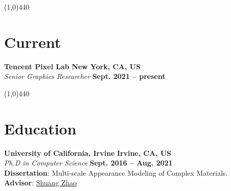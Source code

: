 \documentclass[margin,line]{resume}
\begin{document}
\begin{resume}


    
    \vspace{-5.0mm}
    \line(1,0){440}
    \vspace{-5.0mm}

    \section{\mysidestyle Current}

    \textbf{Tencent Pixel Lab}       \hfill \textbf{New York, CA, US}  \\
    \textsl{Senior Graphics Researcher} 															\hfill \textbf{Sept. 2021 -- present} 

    \vspace{-5.0mm}
    \line(1,0){440}
    \vspace{-5.0mm}

    \section{\mysidestyle Education}
    \textbf{University of California, Irvine}       \hfill \textbf{Irvine, CA, US}  \\
    \textsl{Ph.D in Computer Science} 															\hfill \textbf{Sept. 2016 -- Aug. 2021} \\
    \textbf{Dissertation}: Multi-scale Appearance Modeling of Complex Materials. \\
    \textbf{Advisor}: \href{https://shuangz.com/}{Shuang Zhao} 


\end{resume}
\end{document}
